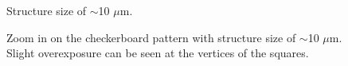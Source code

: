 \begin{figure}[H]
	\centering
	\caption{Structure size of $\sim$10 $\mu$m.}
\end{figure}
\begin{figure}[H]
	\centering
	\caption{Zoom in on the checkerboard pattern with structure size of $\sim$10 $\mu$m. Slight overexposure can be seen at the vertices of the squares.}
	\label{fig:b2d7_q7}
\end{figure}
